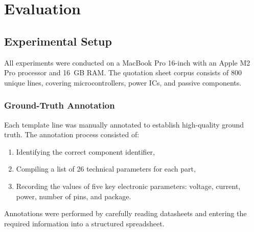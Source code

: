 \chapter{Evaluation}
\label{chapter:evaluation}

\section{Experimental Setup}
All experiments were conducted on a MacBook Pro 16-inch with an Apple M2 Pro processor and 16~GB RAM. The quotation sheet corpus consists of 800 unique lines, covering microcontrollers, power ICs, and passive components.

\subsection{Ground-Truth Annotation}
Each template line was manually annotated to establish high-quality ground truth. The annotation process consisted of:
\begin{enumerate}
  \item Identifying the correct component identifier,
  \item Compiling a list of 26 technical parameters for each part,
  \item Recording the values of five key electronic parameters: voltage, current, power, number of pins, and package.
\end{enumerate}
Annotations were performed by carefully reading datasheets and entering the required information into a structured spreadsheet.

